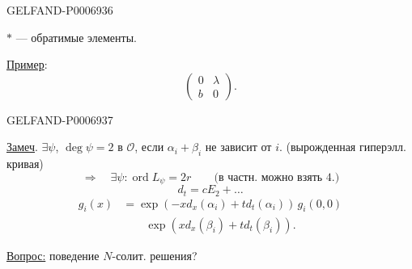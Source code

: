 \begin{GelfandAdjacentEvidence}{GELFAND-P000693}{6}


\(*\) --- обратимые элементы.

\underline{Пример}:
\[
\begin{pmatrix}0&\lambda\\ b&0\end{pmatrix}.
\]
\end{GelfandAdjacentEvidence}
\begin{GelfandAdjacentEvidence}{GELFAND-P000693}{7}


\underline{Замеч}.
\(\exists\psi\), \(\operatorname{deg}\psi=2\) в \(\mathcal O\),
если \(\alpha_i+\beta_i\) не зависит от \(i\).
(вырожденная гиперэлл. кривая)
\[
\Rightarrow\quad\exists\psi:\operatorname{ord}L_\psi=2r
\qquad\text{(в частн. можно взять \(4\).)}
\]
\[
d_t=cE_2+\ldots
\]
\[
\begin{aligned}
g_i(x)&=\exp(-x d_x(\alpha_i)+t d_t(\alpha_i))\,g_i(0,0)\\
&\qquad\exp(x d_x(\beta_i)+t d_t(\beta_i)).
\end{aligned}
\]
\end{GelfandAdjacentEvidence}


\underline{Вопрос:} поведение \(N\)-солит. решения?


